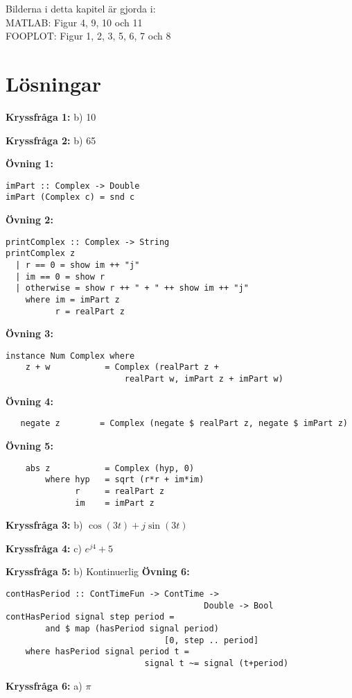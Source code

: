 \documentclass{article}
\begin{document}
\large{Bilderna i detta kapitel är gjorda i:} \\
MATLAB: Figur 4, 9, 10 och 11 \\
FOOPLOT: Figur 1, 2, 3, 5, 6, 7 och 8

\newpage
\section{Lösningar}

\textbf{Kryssfråga 1:} b) 10

\textbf{Kryssfråga 2:} b) 65

\textbf{Övning 1:}
\begin{verbatim}
imPart :: Complex -> Double
imPart (Complex c) = snd c
\end{verbatim}
\textbf{Övning 2:}
\begin{verbatim}
printComplex :: Complex -> String
printComplex z
  | r == 0 = show im ++ "j"
  | im == 0 = show r
  | otherwise = show r ++ " + " ++ show im ++ "j"
    where im = imPart z
          r = realPart z
\end{verbatim}
\textbf{Övning 3:}
\begin{verbatim}
instance Num Complex where
    z + w           = Complex (realPart z + 
                        realPart w, imPart z + imPart w)
\end{verbatim}

\textbf{Övning 4:}
\begin{verbatim}
   negate z        = Complex (negate $ realPart z, negate $ imPart z)
\end{verbatim}

\textbf{Övning 5:}
\begin{verbatim}
    abs z           = Complex (hyp, 0)
        where hyp   = sqrt (r*r + im*im)
              r     = realPart z
              im    = imPart z
\end{verbatim}
\textbf{Kryssfråga 3:} b) $\cos(3t) + j\sin(3t)$

\textbf{Kryssfråga 4:} c) $e^{j4} + 5$

\textbf{Kryssfråga 5:} b) Kontinuerlig
\newline
\textbf{Övning 6:}
\begin{verbatim}
contHasPeriod :: ContTimeFun -> ContTime -> 
                                        Double -> Bool
contHasPeriod signal step period = 
        and $ map (hasPeriod signal period) 
                                [0, step .. period]
    where hasPeriod signal period t = 
                            signal t ~= signal (t+period)
\end{verbatim}
\textbf{Kryssfråga 6:} a) $\pi$
\end{document}
